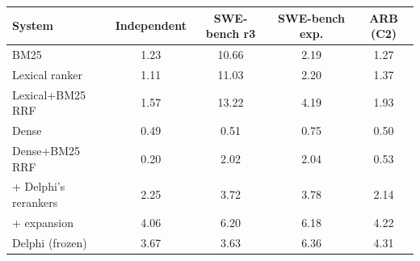 \begin{tabular}{lcccc}
\toprule
System & Independent & SWE-bench r3 & SWE-bench exp. & ARB (C2) \\
\midrule
BM25 & 1.23 & 10.66 & 2.19 & 1.27 \\
Lexical ranker & 1.11 & 11.03 & 2.20 & 1.37 \\
Lexical+BM25 RRF & 1.57 & 13.22 & 4.19 & 1.93 \\
Dense & 0.49 & 0.51 & 0.75 & 0.50 \\
Dense+BM25 RRF & 0.20 & 2.02 & 2.04 & 0.53 \\
+ Delphi's rerankers & 2.25 & 3.72 & 3.78 & 2.14 \\
+ expansion & 4.06 & 6.20 & 6.18 & 4.22 \\
Delphi (frozen) & 3.67 & 3.63 & 6.36 & 4.31 \\
\bottomrule
\end{tabular}%
